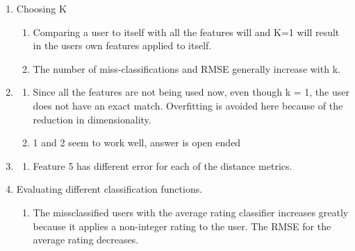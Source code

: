 \documentclass{report}
\begin{document}
\begin{enumerate}

\item Choosing K
  	
  	\begin{enumerate}
    
  	\item {
  	Comparing a user to itself with all the features will and K=1 will result in the users own features applied to itself.
  	}
  	
    \item {
   	The number of miss-classifications and RMSE generally increase with k.
    }
    
	\end{enumerate}
	
\item

	\begin{enumerate}
	
	\item {	
	Since all the features are not being used now, even though k = 1, the user does not have an exact match.
	Overfitting is avoided here because of the reduction in dimensionality.
	}
	
	\item { 1 and 2 seem to work well, answer is open ended}
	
	\end{enumerate}
	
\item 

	\begin{enumerate}
	
	\item {
	Feature 5 has different error for each of the distance metrics.
	}
	
	\end{enumerate}


\item {
Evaluating different classification functions.
}
    \begin{enumerate}
	
	\item {
	The missclassified users with the average rating classifier increases greatly because it applies a non-integer rating to the user.
	The RMSE for the average rating decreases.
	}    
    \end{enumerate}
  
\end{enumerate}
\end{document}
